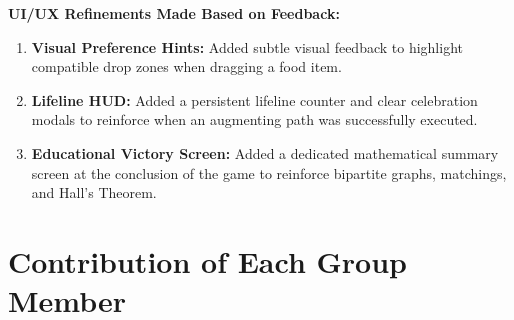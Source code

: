 \documentclass[11pt,a4paper]{article}
\begin{document}
\textbf{UI/UX Refinements Made Based on Feedback:}
\begin{enumerate}
  \item \textbf{Visual Preference Hints:} Added subtle visual feedback to highlight compatible drop zones when dragging a food item.
  \item \textbf{Lifeline HUD:} Added a persistent lifeline counter and clear celebration modals to reinforce when an augmenting path was successfully executed.
  \item \textbf{Educational Victory Screen:} Added a dedicated mathematical summary screen at the conclusion of the game to reinforce bipartite graphs, matchings, and Hall's Theorem.
\end{enumerate}

\section{Contribution of Each Group Member}
\end{document}
